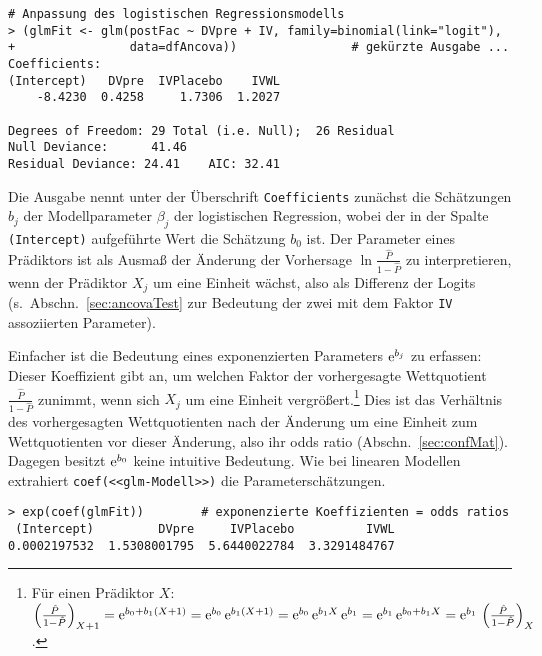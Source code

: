\begin{lstlisting}
# Anpassung des logistischen Regressionsmodells
> (glmFit <- glm(postFac ~ DVpre + IV, family=binomial(link="logit"),
+                data=dfAncova))                # gekürzte Ausgabe ...
Coefficients:
(Intercept)   DVpre  IVPlacebo    IVWL
    -8.4230  0.4258     1.7306  1.2027

Degrees of Freedom: 29 Total (i.e. Null);  26 Residual
Null Deviance:	    41.46
Residual Deviance: 24.41 	AIC: 32.41
\end{lstlisting}

Die Ausgabe nennt unter der Überschrift \lstinline!Coefficients! zunächst die Schätzungen $b_{j}$ der Modellparameter $\beta_{j}$ der logistischen Regression, wobei der in der Spalte \lstinline!(Intercept)! aufgeführte Wert die Schätzung $b_{0}$ ist. Der Parameter eines Prädiktors ist als Ausmaß der Änderung der Vorhersage $\ln \frac{\hat{P}}{1-\hat{P}}$ zu interpretieren, wenn der Prädiktor $X_{j}$ um eine Einheit wächst, also als Differenz der Logits (s.\ Abschn.\ \ref{sec:ancovaTest} zur Bedeutung der zwei mit dem Faktor \lstinline!IV! assoziierten Parameter).

Einfacher ist die Bedeutung eines exponenzierten Parameters ${\mathrm{e}}^{b_{j}}$ zu erfassen: Dieser Koeffizient gibt an, um welchen Faktor der vorhergesagte Wettquotient $\frac{\hat{P}}{1-\hat{P}}$ zunimmt, wenn sich $X_{j}$ um eine Einheit vergrößert.\footnote{Für einen Prädiktor $X$: $\left(\frac{\hat{P}}{1-\hat{P}}\right)_{X+1} = {\mathrm{e}}^{b_{0} + b_{1} (X + 1)} = {\mathrm{e}}^{b_{0}} \, {\mathrm{e}}^{b_{1} (X + 1)} = {\mathrm{e}}^{b_{0}} \, {\mathrm{e}}^{b_{1} X} \, {\mathrm{e}}^{b_{1}} = {\mathrm{e}}^{b_{1}} \, {\mathrm{e}}^{b_{0} + b_{1} X} = {\mathrm{e}}^{b_{1}} \, \left(\frac{\hat{P}}{1-\hat{P}}\right)_{X}$.} Dies ist das Verhältnis des vorhergesagten Wettquotienten nach der Änderung um eine Einheit zum Wettquotienten vor dieser Änderung, also ihr odds ratio (Abschn.\ \ref{sec:confMat}). Dagegen besitzt ${\mathrm{e}}^{b_{0}}$ keine intuitive Bedeutung. Wie bei linearen Modellen extrahiert \lstinline!coef(<<glm-Modell>>)! die Parameterschätzungen.
\begin{lstlisting}
> exp(coef(glmFit))        # exponenzierte Koeffizienten = odds ratios
 (Intercept)         DVpre     IVPlacebo          IVWL
0.0002197532  1.5308001795  5.6440022784  3.3291484767
\end{lstlisting}

